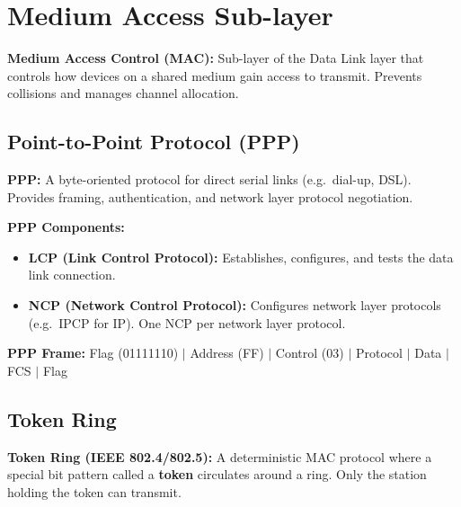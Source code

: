 \documentclass[12pt,a4paper]{article}
\begin{document}
\section{Medium Access Sub-layer}

\begin{tcolorbox}[defbox]
\textbf{Medium Access Control (MAC):} Sub-layer of the Data Link layer that controls how devices on a shared medium gain access to transmit. Prevents collisions and manages channel allocation.
\end{tcolorbox}

\subsection{Point-to-Point Protocol (PPP)}

\begin{tcolorbox}[defbox]
\textbf{PPP:} A byte-oriented protocol for direct serial links (e.g.\ dial-up, DSL). Provides framing, authentication, and network layer protocol negotiation.
\end{tcolorbox}

\textbf{PPP Components:}
\begin{itemize}[leftmargin=*, itemsep=3pt]
  \item \textbf{LCP (Link Control Protocol):} Establishes, configures, and tests the data link connection.
  \item \textbf{NCP (Network Control Protocol):} Configures network layer protocols (e.g.\ IPCP for IP). One NCP per network layer protocol.
\end{itemize}

\textbf{PPP Frame:} Flag (01111110) $|$ Address (FF) $|$ Control (03) $|$ Protocol $|$ Data $|$ FCS $|$ Flag

\subsection{Token Ring}

\begin{tcolorbox}[defbox]
\textbf{Token Ring (IEEE 802.4/802.5):} A deterministic MAC protocol where a special bit pattern called a \textbf{token} circulates around a ring. Only the station holding the token can transmit.
\end{tcolorbox}
\end{document}
